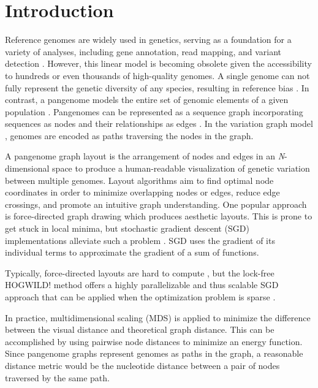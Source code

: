 \documentclass{bioinfo}
\theoremstyle{definition}
\begin{document}
	\section{Introduction}
	Reference genomes are widely used in genetics, serving as a foundation for a variety of analyses, including gene annotation, read mapping, and variant detection \citep{Singh2022}.
	However, this linear model is becoming obsolete given the accessibility to hundreds or even thousands of high-quality genomes.
	A single genome can not fully represent the genetic diversity of any species, resulting in reference bias \citep{Ballouz2019}.
	In contrast, a pangenome models the entire set of genomic elements of a given population \citep{Tettelin_2008,cpang2018,Eizenga_2020, Sherman_2020}.
	Pangenomes can be represented as a sequence graph incorporating sequences as nodes and their relationships as edges \citep{Hein1989}.
	In the variation graph model \citep{Garrison:2018}, genomes are encoded as paths traversing the nodes in the graph.
	
	A pangenome graph layout is the arrangement of nodes and edges in an \textit{N}-dimensional space to produce a human-readable visualization of genetic variation between multiple genomes.
	Layout algorithms aim to find optimal node coordinates in order to minimize overlapping nodes or edges, reduce edge crossings, and promote an intuitive graph understanding.
	One popular approach is force-directed graph drawing \citep{cheong_force-directed_2022} which produces aesthetic layouts.
	This is prone to get stuck in local minima, but stochastic gradient descent (SGD) implementations alleviate such a problem \citep{Zheng2019}.
	SGD uses the gradient of its individual terms to approximate the gradient of a sum of functions.
	
	Typically, force-directed layouts are hard to compute \citep{wang_research_2014}, but the lock-free HOGWILD! method offers a highly parallelizable and thus scalable SGD approach that can be applied when the optimization problem is sparse \citep{Recht2011}.
	
	In practice, multidimensional scaling (MDS) is applied to minimize the difference between the visual distance and theoretical graph distance.
	This can be accomplished by using pairwise node distances to minimize an energy function.
	Since pangenome graphs represent genomes as paths in the graph, a reasonable distance metric would be the nucleotide distance between a pair of nodes traversed by the same path.
	
\end{document}
